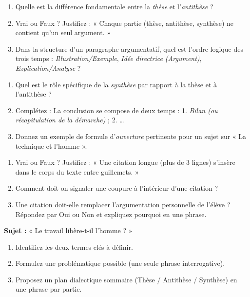 \documentclass[11pt]{article}
\begin{document}
\begin{exercice}
\begin{enumerate}
    \item Quelle est la différence fondamentale entre la \textit{thèse} et l'\textit{antithèse} ?
    \item Vrai ou Faux ? Justifiez : « Chaque partie (thèse, antithèse, synthèse) ne contient qu'un seul argument. »
    \item Dans la structure d'un paragraphe argumentatif, quel est l'ordre logique des trois temps : \textit{Illustration/Exemple}, \textit{Idée directrice (Argument)}, \textit{Explication/Analyse} ?
\end{enumerate}
\end{exercice}

\begin{exercice}
\begin{enumerate}
    \item Quel est le rôle spécifique de la \textit{synthèse} par rapport à la thèse et à l'antithèse ?
    \item Complétez : La conclusion se compose de deux temps : 1. \textit{Bilan (ou récapitulation de la démarche)} ; 2. \dots
    \item Donnez un exemple de formule d'\textit{ouverture} pertinente pour un sujet sur « La technique et l'homme ».
\end{enumerate}
\end{exercice}

\begin{exercice}
\begin{enumerate}
    \item Vrai ou Faux ? Justifiez : « Une citation longue (plus de 3 lignes) s'insère dans le corps du texte entre guillemets. »
    \item Comment doit-on signaler une coupure à l'intérieur d'une citation ?
    \item Une citation doit-elle remplacer l'argumentation personnelle de l'élève ? Répondez par Oui ou Non et expliquez pourquoi en une phrase.
\end{enumerate}
\end{exercice}

\begin{exercice}
\textbf{Sujet :} « Le travail libère-t-il l'homme ? »
\begin{enumerate}
    \item Identifiez les deux termes clés à définir.
    \item Formulez une problématique possible (une seule phrase interrogative).
    \item Proposez un plan dialectique sommaire (Thèse / Antithèse / Synthèse) en une phrase par partie.
\end{enumerate}
\end{exercice}
\end{document}
